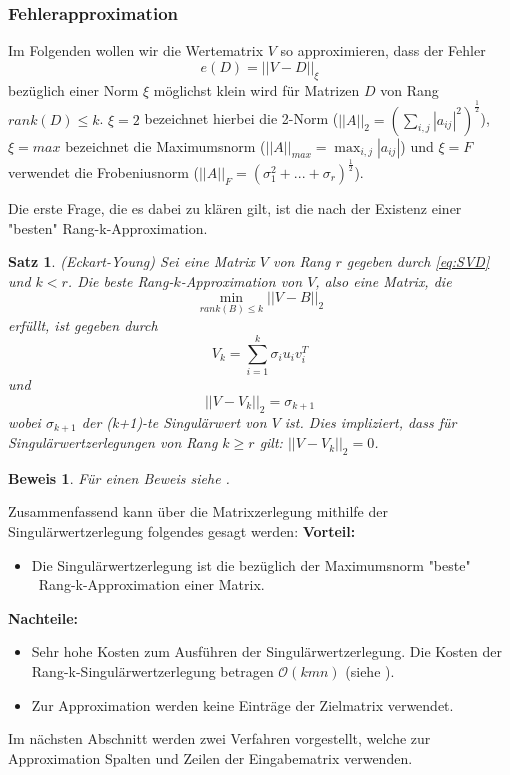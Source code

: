 \documentclass[12pt,a4paper,twoside]{article}
\newtheorem{Satz}{Satz}[section]
\newtheorem{Beweis}{Beweis}
\begin{document}
		\subsubsection{Fehlerapproximation}
		Im Folgenden wollen wir die Wertematrix $V$ so approximieren, dass der Fehler 
		\begin{equation*}
			e(D)=||V-D||_\xi
		\end{equation*}
		bezüglich einer Norm $\xi$ möglichst klein wird für Matrizen $D$ von Rang $rank(D)\leq k$. $\xi=2$ bezeichnet hierbei die 2-Norm ($||A||_2=\left(\sum_{i,j}|a_{ij}|^2\right)^\frac{1}{2}$), $\xi=max$ bezeichnet die Maximumsnorm ($||A||_{max}=\max_{i,j}|a_{ij}|$) und $\xi=F$ verwendet die Frobeniusnorm ($||A||_F=(\sigma_1^2+...+\sigma_r)^\frac{1}{2}$).
		\newline

		Die erste Frage, die es dabei zu klären gilt, ist die nach der Existenz einer  "besten" Rang-k-Approximation.
		\begin{Satz}{(Eckart-Young)}
			Sei eine Matrix $V$ von Rang $r$ gegeben durch \ref{eq:SVD} und $k<r$. Die beste Rang-$k$-Approximation 
			von $V$, also eine Matrix, die
			\begin{equation*}
				\min_{rank(B)\leq k}||V-B||_2	
			\end{equation*}		
			erfüllt, ist gegeben durch
			\begin{equation*}
				 V_k=\sum_{i=1}^k\sigma_i u_i v_i^T
			\end{equation*}
			und 
			\begin{equation*}
				||V-V_k||_2=\sigma_{k+1}
			\end{equation*}
			wobei $\sigma_{k+1}$ der (k+1)-te Singulärwert von $V$ ist. Dies impliziert, dass für Singulärwertzerlegungen von Rang $k\geq r$ gilt: $||V-V_k||_2=0$.
		\end{Satz}
		\begin{Beweis}
			Für einen Beweis siehe \cite{Golub2013}.
		\end{Beweis}
		Zusammenfassend kann über die Matrixzerlegung mithilfe der Singulärwertzerlegung folgendes gesagt werden: \newline
		\newline
		\textbf{Vorteil:}
		\begin{itemize}
			\item Die Singulärwertzerlegung ist die bezüglich der Maximumsnorm "beste" \ Rang-k-Approximation einer Matrix.
\end{itemize}		
		\textbf{Nachteile:} 
		\begin{itemize}
			\item Sehr hohe Kosten zum Ausführen der Singulärwertzerlegung. Die Kosten der Rang-k-Singulärwertzerlegung betragen $\mathcal{O}(kmn)$ (siehe \citep{Drineas2006}).
			\item Zur Approximation werden keine Einträge der Zielmatrix verwendet.
		\end{itemize}
		Im nächsten Abschnitt werden zwei Verfahren vorgestellt, welche zur Approximation Spalten und Zeilen der 
		Eingabematrix verwenden.
\end{document}
